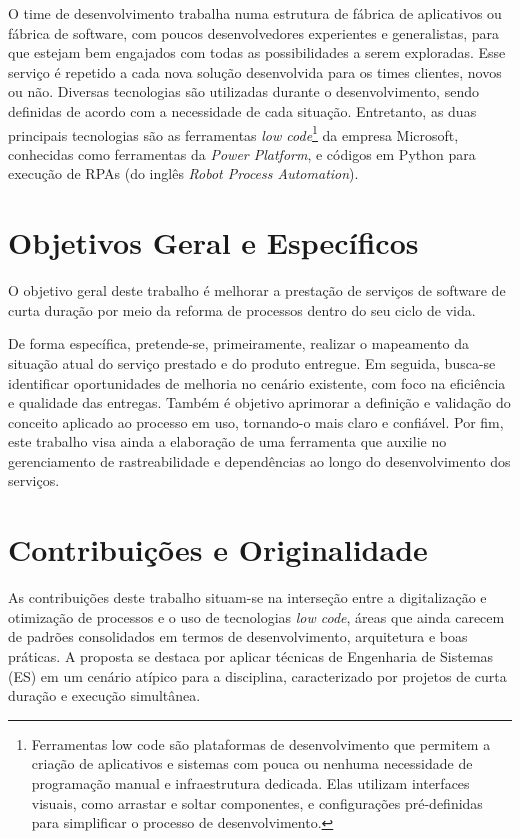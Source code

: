 	O time de desenvolvimento trabalha numa estrutura de fábrica de aplicativos ou fábrica de software, 
	com poucos desenvolvedores experientes e generalistas, para que estejam bem 
	engajados com todas as possibilidades a serem exploradas. Esse serviço é repetido 
	a cada nova solução desenvolvida para os times clientes, novos ou não. 
	Diversas tecnologias são utilizadas durante o desenvolvimento, sendo definidas de 
	acordo com a necessidade de cada situação. Entretanto, as duas principais 
	tecnologias são as ferramentas \textit{low code}\footnote{Ferramentas low code são plataformas de desenvolvimento
	que permitem a criação de aplicativos e sistemas com pouca ou nenhuma necessidade de programação manual e infraestrutura dedicada. Elas utilizam
	interfaces visuais, como arrastar e soltar componentes, e configurações pré-definidas para simplificar o processo de desenvolvimento.}
	da empresa Microsoft, conhecidas como ferramentas da \textit{Power Platform}, e códigos em Python para execução de RPAs (do 
	inglês \textit{Robot Process Automation}).


	\section{Objetivos Geral e Específicos}\label{sec:introducao:objetivos}

	O objetivo geral deste trabalho é melhorar a prestação de serviços de software de curta duração por meio da reforma de processos dentro do seu ciclo de vida.

	De forma específica, pretende-se, primeiramente, realizar o mapeamento da situação atual do serviço prestado e do produto entregue.
	Em seguida, busca-se identificar oportunidades de melhoria no cenário existente, com foco na eficiência e qualidade das entregas.
	Também é objetivo aprimorar a definição e validação do conceito aplicado ao processo em uso, tornando-o mais claro e confiável.
	Por fim, este trabalho visa ainda a elaboração de uma ferramenta que auxilie no gerenciamento de rastreabilidade e dependências ao longo do desenvolvimento dos serviços.

 		
	\section{Contribuições e Originalidade}\label{sec:introducao:contribuicoes}

	As contribuições deste trabalho situam-se na interseção entre a digitalização e otimização de processos e o uso de tecnologias \textit{low code},
	áreas que ainda carecem de padrões consolidados em termos de desenvolvimento, arquitetura e boas práticas. A proposta se destaca por
	aplicar técnicas de Engenharia de Sistemas (ES) em um cenário atípico para a disciplina, caracterizado por projetos de curta duração e execução simultânea.

